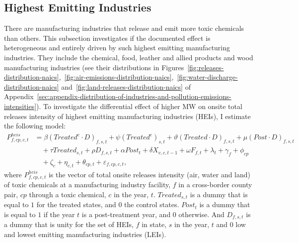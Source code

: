 \documentclass[12pt, english]{article}
\begin{document}
    \subsection{Highest Emitting Industries}\label{subsec:highest-emitting-industries}
    There are manufacturing industries that release and emit more toxic chemicals than others. This subsection investigates if the documented effect is heterogeneous and entirely driven by such highest emitting manufacturing industries. They include the chemical, food, leather and allied products and wood manufacturing industries (see their distributions in Figures~\ref{fig:releases-distribution-naics},~\ref{fig:air-emissions-distribution-naics},~\ref{fig:water-discharge-distribution-naics} and~\ref{fig:land-releases-distribution-naics} of Appendix~\ref{sec:appendix-distribution-of-industries-and-pollution-emissions-intensities}). To investigate the differential effect of higher MW on onsite total releases intensity of highest emitting manufacturing industries (HEIs), I estimate the following model:
    \begin{align}
        P_{f,cp,c,t}^{heis} &= \beta (Treated^{e} \cdot D)_{f,s,t} + \psi (Treated^{e})_{s,t} + \vartheta (Treated \cdot D)_{f,s,t} + \mu (Post \cdot D)_{f,s,t} \nonumber \\
        &\quad + \tau Treated_{s,t} + \rho D_{f,s,t} + \alpha Post_{t} + \delta X_{v,c,t-1} + \omega F_{f,t} + \lambda_{t} + \gamma_{f} + \phi_{cp} \nonumber \\
        &\quad + \zeta_{c} + \eta_{c,t} + \theta_{cp,t} + \varepsilon_{f,cp,c,t},\label{eq:heterogeneous-onsite-releases-intensity-heis}
    \end{align}
    where $P_{f,cp,c,t}^{heis}$ is the vector of total onsite releases intensity (air, water and land) of toxic chemicals at a manufacturing industry facility, $f$ in a cross-border county pair, $cp$ through a toxic chemical, $c$ in the year, $t$. $Treated_{s,t}$ is a dummy that is equal to $1$ for the treated states, and $0$ the control states. $Post_{t}$ is a dummy that is equal to $1$ if the year $t$ is a post-treatment year, and $0$ otherwise. And $D_{f,s,t}$ is a dummy that is unity for the set of HEIs, $f$ in state, $s$ in the year, $t$ and $0$ low and lowest emitting manufacturing industries (LEIs).
    
\end{document}
